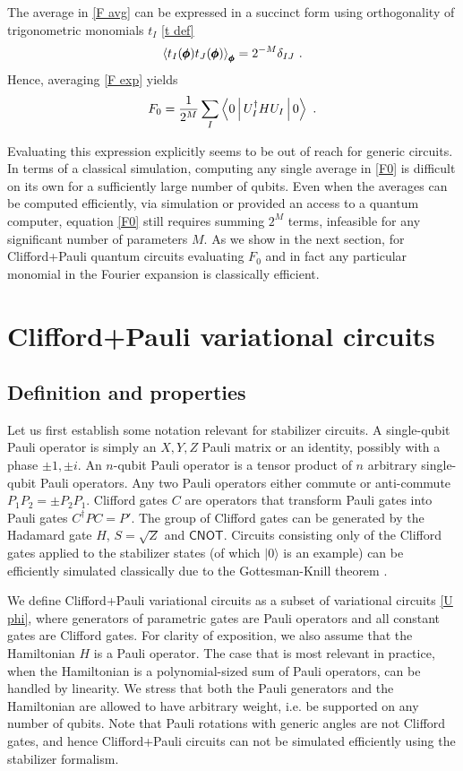 \documentclass[twocolumn, amsfonts, amssymb, aps, nofootinbib]{revtex4-2}
\newcommand{\CX}{\textsf{CNOT}}
\newcommand{\CP}{Clifford+Pauli}
\begin{document}
The average in \eqref{F avg} can be expressed in a succinct form using orthogonality of trigonometric monomials $t_I$ \eqref{t def}  
\begin{align}
	\Braket{t_I(\pmb\phi) t_J(\pmb\phi)}_{\pmb\phi}=2^{-M}\delta_{IJ} \ . \label{t product}
\end{align}
Hence, averaging \eqref{F exp} yields
\begin{align}
	F_0=\frac{1}{2^M}\sum_{I}\Braket{0|U_I^\dagger H U_I|0} \ . \label{F0}
\end{align}

Evaluating this expression explicitly seems to be out of reach for generic circuits. In terms of a classical simulation, computing any single average in \eqref{F0} is difficult on its own for a sufficiently large number of qubits. Even when the averages can be computed efficiently, via simulation or provided an access to a quantum computer, equation \eqref{F0} still requires summing $2^M$ terms, infeasible for any significant number of parameters $M$. As we show in the next section, for \CP{} quantum circuits evaluating $F_0$ and in fact any particular monomial in the Fourier expansion is classically efficient. 
\section{\CP{} variational circuits}
\subsection{Definition and properties}
Let us first establish some notation relevant for stabilizer circuits. A single-qubit Pauli operator is simply an $X, Y, Z$ Pauli matrix or an identity, possibly with a phase $\pm1, \pm i$. An $n$-qubit Pauli operator is a tensor product of $n$ arbitrary single-qubit Pauli operators. Any two Pauli operators either commute or anti-commute $P_1P_2=\pm P_2P_1$. Clifford gates $C$ are operators that transform Pauli gates into Pauli gates $C^\dagger P C=P'$. The group of Clifford gates can be generated by the Hadamard gate $H$, $S=\sqrt{Z}$ and $\CX{}$. Circuits consisting only of the Clifford gates applied to the stabilizer states (of which $|0\rangle$ is an example) can be efficiently simulated classically due to the Gottesman-Knill theorem \cite{Aaronson2004}.

We define \CP{} variational circuits as a subset of variational circuits \eqref{U phi}, where generators of parametric gates are Pauli operators and all constant gates are Clifford gates. For clarity of exposition, we also assume that the Hamiltonian $H$ is a Pauli operator. The case that is most relevant in practice, when the Hamiltonian is a polynomial-sized sum of Pauli operators, can be handled by linearity. We stress that both the Pauli generators and the Hamiltonian are allowed to have arbitrary weight, i.e. be supported on any number of qubits.
Note that Pauli rotations with generic angles are not Clifford gates, and hence \CP{} circuits can not be simulated efficiently using the stabilizer formalism. 
\end{document}
